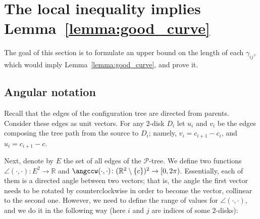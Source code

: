 \section{The local inequality implies Lemma~\ref{lemma:good_curve}}

The goal of this section is to formulate an upper bound on the length of each $\gamma_{ij}$, which would imply Lemma~\ref{lemma:good_curve}, and prove it.

\subsection{Angular notation}

Recall that the edges of the configuration tree are directed from parents. Consider these edges as unit vectors.
For any $2$-disk $D_i$ let $u_i$ and $v_i$ be the edges composing the tree path from the source to $D_i$; namely, $v_i = c_{i+1} - c_i$, and $u_i = c_{i+1} - c$.

Next, denote by $E$ the set of all edges of the $\mathcal{P}$-tree. We define two functions $\angle(\cdot, \cdot)\colon E^2\to\mathbb{R}$ and $\angccw(\cdot, \cdot)\colon (\mathbb{R}^2\setminus\{c\})^2\to[0, 2\pi)$. Essentially, each of them is a directed angle between two vectors; that is, the angle the first vector needs to be rotated by counterclockwise in order to become the vector, collinear to the second one. However, we need to define the range of values for $\angle(\cdot, \cdot)$, and we do it in the following way (here $i$ and $j$ are indices of some $2$-disks):


